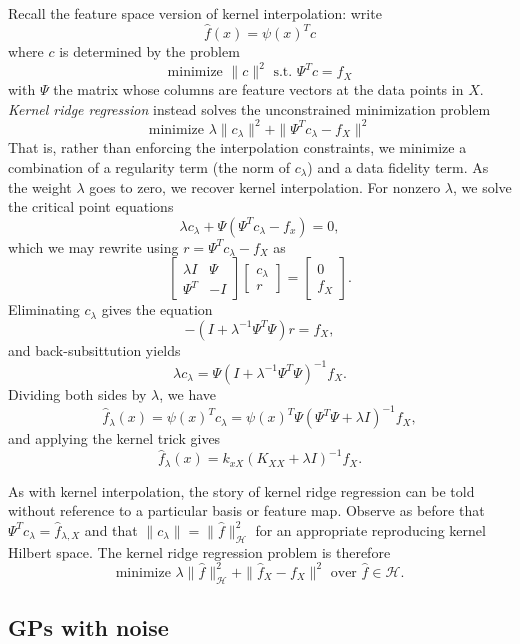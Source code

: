 \documentclass[12pt, leqno]{article} %
\begin{document}
Recall the feature space version of kernel interpolation: write
\[
\hat{f}(x) = \psi(x)^T c
\]
where $c$ is determined by the problem
\[
  \mbox{minimize } \|c\|^2 \mbox{ s.t.~} \Psi^T c = f_X
\]
with $\Psi$ the matrix whose columns are feature vectors at the data
points in $X$.
{\em Kernel ridge regression} instead solves the unconstrained
minimization problem
\[
  \mbox{minimize } \lambda \|c_{\lambda}\|^2 + \|\Psi^T c_{\lambda} - f_X\|^2
\]
That is, rather than enforcing the interpolation constraints, we
minimize a combination of a regularity term (the norm of
$c_{\lambda}$) and a data fidelity term.  As the weight $\lambda$ goes
to zero, we recover kernel interpolation.  For nonzero $\lambda$,
we solve the critical point equations
\[
  \lambda c_{\lambda} + \Psi (\Psi^T c_{\lambda} - f_x) = 0,
\]
which we may rewrite using $r = \Psi^T c_\lambda -f_X$ as
\[
  \begin{bmatrix}
    \lambda I & \Psi \\
    \Psi^T & -I
  \end{bmatrix}
  \begin{bmatrix} c_\lambda \\ r \end{bmatrix} =
  \begin{bmatrix} 0 \\ f_X \end{bmatrix}.
\]
Eliminating $c_{\lambda}$ gives the equation
\[
  -(I+\lambda^{-1} \Psi^T \Psi) r = f_X,
\]
and back-subsittution yields
\[
  \lambda c_{\lambda} = \Psi (I+\lambda^{-1} \Psi^T \Psi)^{-1} f_X.
\]
Dividing both sides by $\lambda$, we have
\[
  \hat{f}_{\lambda}(x) = \psi(x)^T c_{\lambda} =
    \psi(x)^T \Psi (\Psi^T \Psi + \lambda I)^{-1} f_X,
\]
and applying the kernel trick gives
\[
  \hat{f}_{\lambda}(x) = k_{xX} (K_{XX} + \lambda I)^{-1} f_X.
\]

As with kernel interpolation, the story of kernel ridge regression can
be told without reference to a particular basis or feature map.
Observe as before that $\Psi^T c_{\lambda} = \hat{f}_{\lambda,X}$ and that
$\|c_{\lambda}\| = \|\hat{f}\|_{\mathcal{H}}^2$ for an appropriate
reproducing kernel Hilbert space.  The kernel ridge regression problem
is therefore
\[
  \mbox{minimize } \lambda \|\hat{f}\|_{\mathcal{H}}^2 + \|\hat{f}_X -f_X\|^2
  \mbox{ over } \hat{f} \in \mathcal{H}.
\]

\subsection{GPs with noise}
\end{document}
